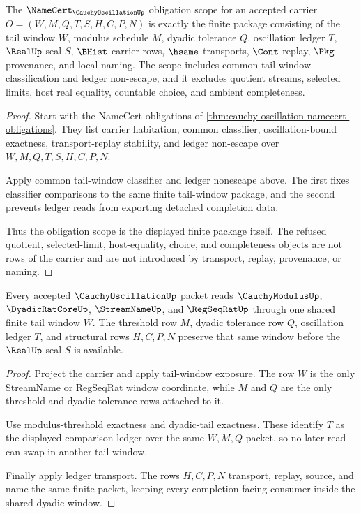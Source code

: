 \begin{theorem}
\label{thm:cauchy-oscillation-namecert-obligation-scope}
The $\NameCert_{\CauchyOscillationUp}$ obligation scope for an accepted carrier $O=(W,M,Q,T,S,H,C,P,N)$ is exactly the finite package consisting of the tail window $W$, modulus schedule $M$, dyadic tolerance $Q$, oscillation ledger $T$, $\RealUp$ seal $S$, $\BHist$ carrier rows, $\hsame$ transports, $\Cont$ replay, $\Pkg$ provenance, and local naming. The scope includes common tail-window classification and ledger non-escape, and it excludes quotient streams, selected limits, host real equality, countable choice, and ambient completeness.
\end{theorem}
\begin{proof}
Start with the NameCert obligations of \autoref{thm:cauchy-oscillation-namecert-obligations}. They list carrier habitation, common classifier, oscillation-bound exactness, transport-replay stability, and ledger non-escape over $W,M,Q,T,S,H,C,P,N$.

Apply common tail-window classifier and ledger nonescape above. The first fixes classifier comparisons to the same finite tail-window package, and the second prevents ledger reads from exporting detached completion data.

Thus the obligation scope is the displayed finite package itself. The refused quotient, selected-limit, host-equality, choice, and completeness objects are not rows of the carrier and are not introduced by transport, replay, provenance, or naming.
\end{proof}

\begin{theorem}
\label{thm:cauchy-oscillation-shared-dyadic-window-scope}
Every accepted $\CauchyOscillationUp$ packet reads $\CauchyModulusUp$, $\DyadicRatCoreUp$, $\StreamNameUp$, and $\RegSeqRatUp$ through one shared finite tail window $W$. The threshold row $M$, dyadic tolerance row $Q$, oscillation ledger $T$, and structural rows $H,C,P,N$ preserve that same window before the $\RealUp$ seal $S$ is available.
\end{theorem}
\begin{proof}
Project the carrier and apply tail-window exposure. The row $W$ is the only StreamName or RegSeqRat window coordinate, while $M$ and $Q$ are the only threshold and dyadic tolerance rows attached to it.

Use modulus-threshold exactness and dyadic-tail exactness. These identify $T$ as the displayed comparison ledger over the same $W,M,Q$ packet, so no later read can swap in another tail window.

Finally apply ledger transport. The rows $H,C,P,N$ transport, replay, source, and name the same finite packet, keeping every completion-facing consumer inside the shared dyadic window.
\end{proof}

